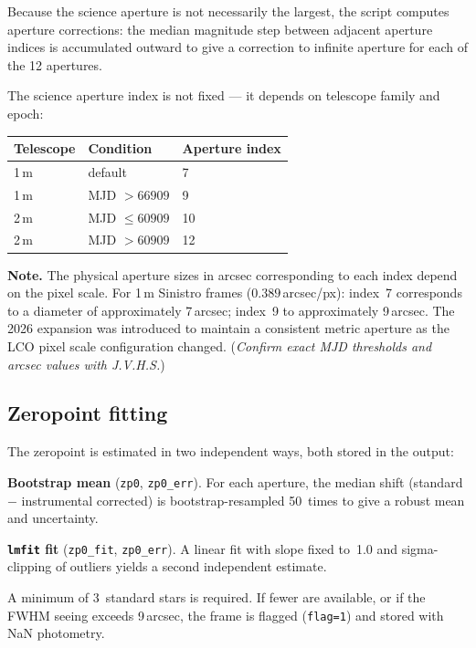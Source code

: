 \documentclass[12pt,a4paper]{article}
\begin{document}
\label{sec:aper}

Because the science aperture is not necessarily the largest, the script computes aperture
corrections: the median magnitude step between adjacent aperture indices is accumulated
outward to give a correction to infinite aperture for each of the 12 apertures.

The science aperture index is not fixed --- it depends on telescope family and epoch:
\begin{center}
\begin{tabular}{lll}
\toprule
Telescope & Condition & Aperture index \\
\midrule
1\,m & default & 7 \\
1\,m & MJD $> 66909$ & 9 \\
2\,m & MJD $\leq 60909$ & 10 \\
2\,m & MJD $> 60909$ & 12 \\
\bottomrule
\end{tabular}
\end{center}

\begin{notebox}
\textbf{Note.}  The physical aperture sizes in arcsec corresponding to each index depend on
the pixel scale.  For 1\,m Sinistro frames ($0.389$\,arcsec/px): index~7 corresponds to a
diameter of approximately 7\,arcsec; index~9 to approximately 9\,arcsec.  The 2026
expansion was introduced to maintain a consistent metric aperture as the LCO pixel scale
configuration changed. (\textit{Confirm exact MJD thresholds and arcsec values with
J.V.H.S.})
\end{notebox}

\subsection{Zeropoint fitting}

The zeropoint is estimated in two independent ways, both stored in the output:

\textbf{Bootstrap mean} (\texttt{zp0}, \texttt{zp0\_err}).  For each aperture, the median
shift (standard $-$ instrumental corrected) is bootstrap-resampled 50~times to give a
robust mean and uncertainty.

\textbf{\texttt{lmfit} fit} (\texttt{zp0\_fit}, \texttt{zp0\_err}).  A linear fit with
slope fixed to~1.0 and sigma-clipping of outliers yields a second independent estimate.

A minimum of 3~standard stars is required.  If fewer are available, or if the FWHM seeing
exceeds 9\,arcsec, the frame is flagged (\texttt{flag=1}) and stored with NaN photometry.
\end{document}
